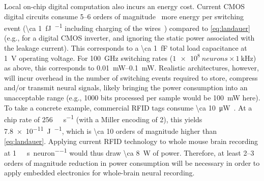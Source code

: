 Local on-chip digital computation also incurs an energy cost.
Current CMOS digital circuits consume 5--6 orders of magnitude~\cite{tucker11,koomey11,yablonovitch08,tucker11b} more energy per switching event (\SI{\ca 1}{\femto\joule\per\bit} including charging of the wires~\cite{tucker11}) compared to \ref{eq:landauer} (e.g., for a digital CMOS inverter, and ignoring the static power associated with the leakage current).
This corresponds to a \SI{\ca 1}{\femto\farad} total load capacitance at \SI{1}{\volt} operating voltage. For \SI{100}{\giga\hertz} switching rates ($\SI{1e8}{neurons} \times \SI{1}{\kilo\hertz}$) as above, this corresponds to \SIrange{0.01}{0.1}{\milli\watt}.
Realistic architectures, however, will incur overhead in the number of switching events required to store, compress and/or transmit neural signals, likely bringing the power consumption into an unacceptable range (e.g., \num{1000} bits processed per sample would be \SI{100}{\milli\watt} here).
To take a concrete example, commercial RFID tags consume \SI{\ca 10}{\micro\watt}~\cite{rfidsheet}.
At a chip rate of \SI{256}{\kilo\bit\per\second} (with a Miller encoding of 2), this yields \SI{7.8e-11}{\joule\per\bit}, which is \num{\ca 10} orders of magnitude higher than \ref{eq:landauer}.
Applying current RFID technology to whole mouse brain recording at \SI{1}{\kilo\bit\per\second\per neuron} would thus draw \SI{\ca 8}{\watt} of power.
Therefore, at least 2--3 orders of magnitude reduction in power consumption will be necessary in order to apply embedded electronics for whole-brain neural recording.


